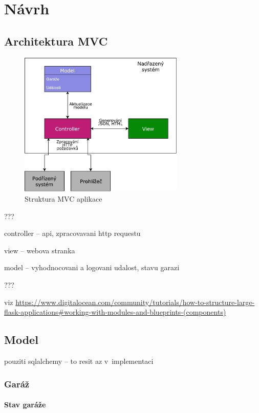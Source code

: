 \chapter{Návrh}
\label{sec:de}

\section{Architektura MVC}

\begin{figure}[h!]
    \centering
    \includegraphics[width=0.7\textwidth]{images/mvc.pdf}
    \caption{Struktura MVC aplikace}
    \label{fig:mvc}
\end{figure}

???

controller -- api, zpracovavani http requestu

view -- webova stranka

model -- vyhodnocovani a logovani udalost, stavu garazi

???

viz \url{https://www.digitalocean.com/community/tutorials/how-to-structure-large-flask-applications#working-with-modules-and-blueprints-(components)}

\section{Model}

pouziti sqlalchemy -- to resit az v~implementaci

\subsection{Garáž}

\subsubsection{Stav garáže}

